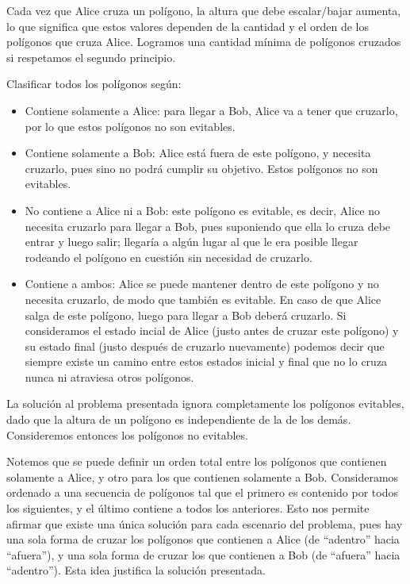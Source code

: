 Cada vez que Alice cruza un polígono, la altura que debe escalar/bajar aumenta,
lo que significa que estos valores dependen de la cantidad y el orden de los
polígonos que cruza Alice. Logramos una cantidad mínima de polígonos cruzados si
respetamos el segundo principio.

Clasificar todos los polígonos según:

\begin{itemize}
\item Contiene solamente a Alice: para llegar a Bob, Alice va a tener que
cruzarlo, por lo que estos polígonos no son evitables.

\item Contiene solamente a Bob: Alice está fuera de este polígono, y necesita
cruzarlo, pues sino no podrá cumplir su objetivo. Estos polígonos no son
evitables.

\item No contiene a Alice ni a Bob: este polígono es evitable, es decir,
Alice no necesita cruzarlo para llegar a Bob, pues suponiendo que ella lo cruza
debe entrar y luego salir; llegaría a algún lugar al que le era posible llegar 
rodeando el polígono en cuestión sin necesidad de cruzarlo.

\item Contiene a ambos: Alice se puede mantener dentro de este polígono
y no necesita cruzarlo, de modo que también es evitable. En caso de que
Alice salga de este polígono, luego para llegar a Bob deberá cruzarlo. Si
consideramos el estado incial de Alice (justo antes de cruzar este polígono)
y su estado final (justo después de cruzarlo nuevamente) podemos decir que
siempre existe un camino entre estos estados inicial y final que no lo cruza
nunca ni atraviesa otros polígonos.
\end{itemize}

La solución al problema presentada ignora completamente los polígonos
evitables, dado que la altura de un polígono es independiente de la de los
demás. Consideremos entonces los polígonos no evitables.

Notemos que se puede definir un orden total entre los polígonos que contienen
solamente a Alice, y otro para los que contienen solamente a Bob. Consideramos
ordenado a una secuencia de polígonos tal que el primero es contenido por
todos los siguientes, y el último contiene a todos los anteriores. Esto
nos permite afirmar que existe una única solución para cada escenario del
problema, pues hay una sola forma de cruzar los polígonos que contienen a
Alice (de ``adentro'' hacia ``afuera''), y una sola forma de cruzar los que
contienen a Bob (de ``afuera'' hacia ``adentro''). Esta idea justifica la
solución presentada.

